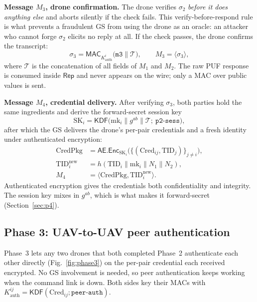\documentclass[journal]{IEEEtran}
\begin{document}
\textbf{Message $M_3$, drone confirmation.} The drone verifies $\sigma_2$
\emph{before it does anything else} and aborts silently if the check fails.
This verify-before-respond rule is what prevents a fraudulent GS from using the
drone as an oracle: an attacker who cannot forge $\sigma_2$ elicits no reply at
all. If the check passes, the drone confirms the transcript:
\begin{equation}
\sigma_3 = \mathsf{MAC}_{K^{i}_{\text{auth}}}\big(\texttt{m3} \| \mathcal{T}\big), \qquad
M_3 = \langle \sigma_3 \rangle,
\end{equation}
where $\mathcal{T}$ is the concatenation of all fields of $M_1$ and $M_2$. The
raw PUF response is consumed inside $\mathsf{Rep}$ and never appears on the
wire; only a MAC over public values is sent.

\textbf{Message $M_4$, credential delivery.} After verifying $\sigma_3$, both
parties hold the same ingredients and derive the forward-secret session key
\begin{equation}
\text{SK}_i = \mathsf{KDF}\big(\text{mk}_i \| g^{ab} \| \mathcal{T};\ \texttt{p2-sess}\big),
\label{eq:sk2}
\end{equation}
after which the GS delivers the drone's per-pair credentials and a fresh
identity under authenticated encryption:
\begin{align}
\text{CredPkg} &= \mathsf{AE}.\mathsf{Enc}_{\text{SK}_i}\big(\{(\text{Cred}_{ij}, \text{TID}_j)\}_{j \ne i}\big),\\
\text{TID}_i^{\text{new}} &= h(\text{TID}_i \| \text{mk}_i \| N_1 \| N_2),\\
M_4 &= \langle \text{CredPkg}, \text{TID}_i^{\text{new}} \rangle.
\end{align}
Authenticated encryption gives the credentials both confidentiality and
integrity. The session key mixes in $g^{ab}$, which is what makes it
forward-secret (Section~\ref{sec:p4}).

\subsection{Phase 3: UAV-to-UAV peer authentication}
\label{sec:p3}

Phase~3 lets any two drones that both completed Phase~2 authenticate each other
directly (Fig.~\ref{fig:phase3}) on the per-pair credential each received
encrypted. No GS involvement is needed, so peer authentication keeps working
when the command link is down. Both sides key their MACs with
$K^{ij}_{\text{auth}} = \mathsf{KDF}(\text{Cred}_{ij}; \texttt{peer-auth})$.
\end{document}
